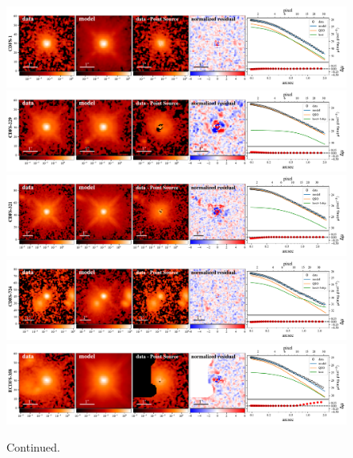 \documentclass[apj]{emulateapj}
\begin{document}
\begin{figure}
\centering
{
\includegraphics[height=0.25\textwidth]{fig/best_fit_CDFS-1_SB_profile.pdf}
\includegraphics[height=0.25\textwidth]{fig/best_fit_CDFS-229_SB_profile.pdf}
\includegraphics[height=0.25\textwidth]{fig/best_fit_CDFS-321_SB_profile.pdf}
\includegraphics[height=0.25\textwidth]{fig/best_fit_CDFS-724_SB_profile.pdf}
\includegraphics[height=0.25\textwidth]{fig/best_fit_ECDFS-358_SB_profile.pdf}
}
\caption{\label{fig:ML} Continued.}
\end{figure} 


\end{document}
